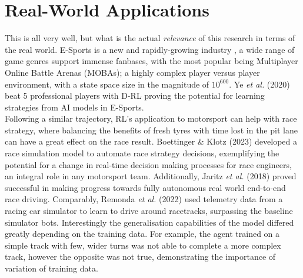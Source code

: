\section{Real-World Applications}
This is all very well, but what is the actual \textit{relevance} of this research in terms of the real world. E-Sports is a new and rapidly-growing industry \cite{block2021esports}, a wide range of game genres support immense fanbases, with the most popular being Multiplayer Online Battle Arenas (MOBAs); a highly complex player versus player environment, with a state space size in the magnitude of $10^{600}$. Ye \textit{et al.} (2020) \cite{ye2020mastering} beat 5 professional players with D-RL proving the potential for learning strategies from AI models in E-Sports.\\ Following a similar trajectory, RL's application to motorsport can help with race strategy, where balancing the benefits of fresh tyres with time lost in the pit lane can have a great effect on the race result. Boettinger \& Klotz (2023) \cite{boettinger2023mastering} developed a race simulation model to automate race strategy decisions, exemplifying the potential for a change in real-time decision making processes for race engineers, an integral role in any motorsport team. Additionally, Jaritz \textit{et al.} (2018) \cite{jaritz2018end} proved successful in making progress towards fully autonomous real world end-to-end race driving. Comparably, Remonda \textit{et al.} (2022) \cite{remonda2021formula} used telemetry data from a racing car simulator to learn to drive around racetracks, surpassing the baseline simulator bots. Interestingly the generalisation capabilities of the model differed greatly depending on the training data. For example, the agent trained on a simple track with few, wider turns was not able to complete a more complex track, however the opposite was not true, demonstrating the importance of variation of training data.
